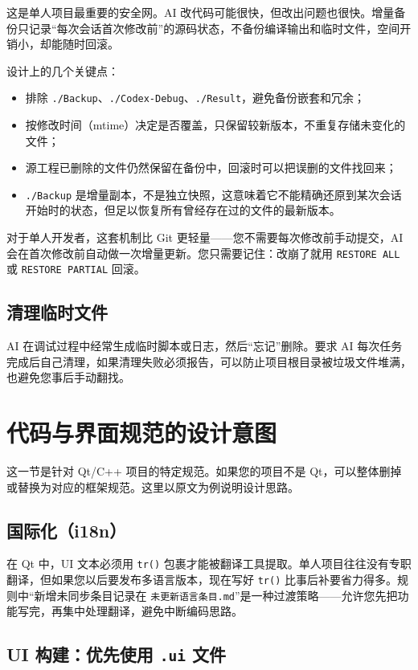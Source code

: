 这是单人项目最重要的安全网。AI 改代码可能很快，但改出问题也很快。增量备份只记录“每次会话首次修改前”的源码状态，不备份编译输出和临时文件，空间开销小，却能随时回滚。

设计上的几个关键点：

\begin{itemize}
	\item 排除 \texttt{./Backup}、\texttt{./Codex-Debug}、\texttt{./Result}，避免备份嵌套和冗余；
	\item 按修改时间（mtime）决定是否覆盖，只保留较新版本，不重复存储未变化的文件；
	\item 源工程已删除的文件仍然保留在备份中，回滚时可以把误删的文件找回来；
	\item \texttt{./Backup} 是增量副本，不是独立快照，这意味着它不能精确还原到某次会话开始时的状态，但足以恢复所有曾经存在过的文件的最新版本。
\end{itemize}

对于单人开发者，这套机制比 Git 更轻量——您不需要每次修改前手动提交，AI 会在首次修改前自动做一次增量更新。您只需要记住：改崩了就用 \texttt{RESTORE ALL} 或 \texttt{RESTORE PARTIAL} 回滚。

\subsection{清理临时文件}

AI 在调试过程中经常生成临时脚本或日志，然后“忘记”删除。要求 AI 每次任务完成后自己清理，如果清理失败必须报告，可以防止项目根目录被垃圾文件堆满，也避免您事后手动翻找。

\section{代码与界面规范的设计意图}

这一节是针对 Qt/C++ 项目的特定规范。如果您的项目不是 Qt，可以整体删掉或替换为对应的框架规范。这里以原文为例说明设计思路。

\subsection{国际化（i18n）}

在 Qt 中，UI 文本必须用 \texttt{tr()} 包裹才能被翻译工具提取。单人项目往往没有专职翻译，但如果您以后要发布多语言版本，现在写好 \texttt{tr()} 比事后补要省力得多。规则中“新增未同步条目记录在 \texttt{未更新语言条目.md}”是一种过渡策略——允许您先把功能写完，再集中处理翻译，避免中断编码思路。

\subsection{UI 构建：优先使用 \texttt{.ui} 文件}

